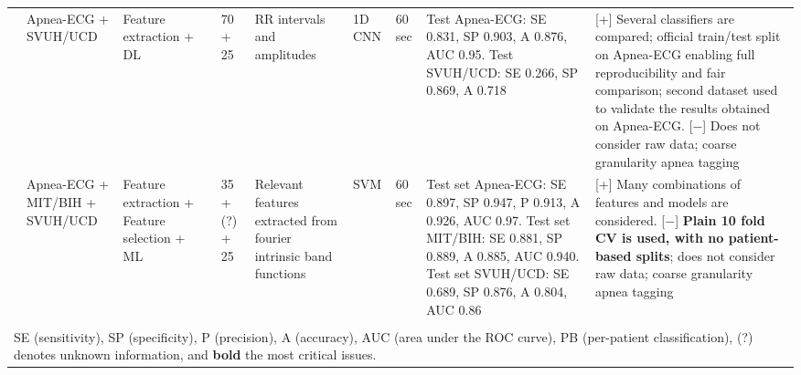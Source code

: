 \documentclass[5p,twocolumn,lefttitle]{elsarticle}
\begin{document}
\begin{table*}[!ht]
{\begin{tabularx}{2\textwidth}{@{}m{2.5em}p{7em}p{10em}lp{2em}p{12em}p{7em}p{3em}p{17em}X@{}}
            \cmidrule(l){2-10} 
                            & Apnea-ECG + SVUH/UCD                                    & Feature extraction + DL                                        & \cite{wang2019sleep}                     & 70 + 25       & RR intervals and amplitudes                                                                                      & 1D CNN                              & 60 sec                                     & Test Apnea-ECG: SE 0.831, SP 0.903, A 0.876, AUC 0.95. Test SVUH/UCD: SE 0.266, SP 0.869, A 0.718                                                                                           & [+] Several classifiers are compared; official train/test split on Apnea-ECG enabling full reproducibility and fair comparison; second dataset used to validate the results obtained on Apnea-ECG. [$-$] Does not consider raw data; coarse granularity apnea tagging                                                                                                                                                                           \\
            \cmidrule(l){2-10} 
                            & Apnea-ECG + MIT/BIH + SVUH/UCD                          & Feature extraction + Feature selection + ML                    & \cite{fatimah2020detection}              & 35 + (?) + 25 & Relevant features extracted from fourier intrinsic band functions                                                 & SVM                                 & 60 sec                                     & Test set Apnea-ECG: SE 0.897, SP 0.947, P 0.913, A 0.926, AUC 0.97. Test set MIT/BIH: SE 0.881, SP 0.889, A 0.885, AUC 0.940. Test set SVUH/UCD: SE 0.689, SP 0.876, A 0.804, AUC 0.86 & [+] Many combinations of features and models are considered. [$-$] \textbf{Plain 10 fold CV is used, with no patient-based splits}; does not consider raw data; coarse granularity apnea tagging                                                                                                                                                                                                                                                      \\
\bottomrule \\
\multicolumn{10}{l}{\large SE (sensitivity), SP (specificity), P (precision), A (accuracy), AUC (area under the ROC curve), PB (per-patient classification), (?) denotes unknown information, and \textbf{bold} the most critical issues.}
\end{tabularx}}
\end{table*}
\end{document}
